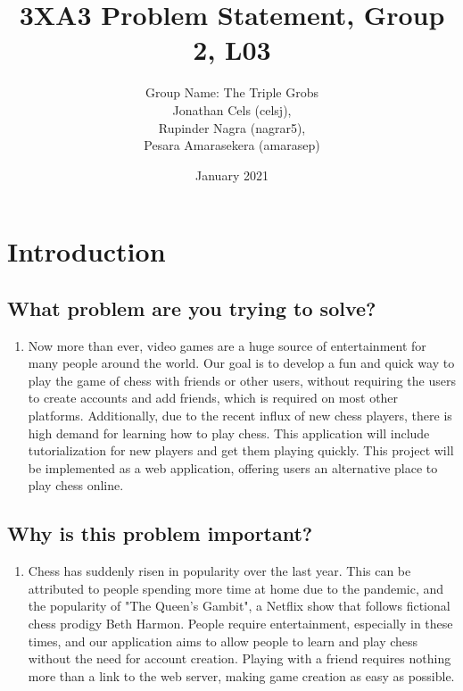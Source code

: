 \documentclass{article}
\title{3XA3 Problem Statement, Group 2, L03}
\author{Group Name: The Triple Grobs \\ Jonathan Cels (celsj), \\Rupinder Nagra (nagrar5), \\Pesara Amarasekera (amarasep)}
\date{January 2021}
\begin{document}
\maketitle
\section{Introduction}
\subsection{What problem are you trying to solve?}
\begin{enumerate}[label={}]
    \item Now more than ever, video games are a huge source of entertainment for many people around the world. Our goal is to develop a fun and quick way to play the game of chess with friends or other users, without requiring the users to create accounts and add friends, which is required on most other platforms. Additionally, due to the recent influx of new chess players, there is high demand for learning how to play chess. This application will include tutorialization for new players and get them playing quickly. This project will be implemented as a web application, offering users an alternative place to play chess online.
\end{enumerate}

\subsection{Why is this problem important?}
\begin{enumerate}[label={}]
    \item Chess has suddenly risen in popularity over the last year. This can be attributed to people spending more time at home due to the pandemic, and the popularity of "The Queen's Gambit", a Netflix show that follows fictional chess prodigy Beth Harmon. People require entertainment, especially in these times, and our application aims to allow people to learn and play chess without the need for account creation. Playing with a friend requires nothing more than a link to the web server, making game creation as easy as possible.
\end{enumerate}
\end{document}
